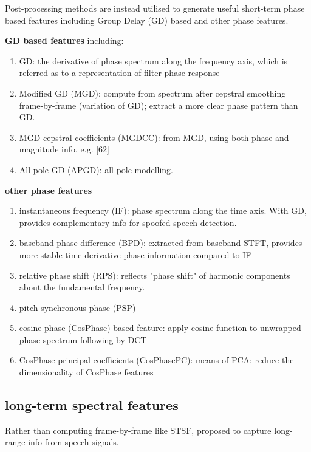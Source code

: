 \documentclass{article}
\begin{document}
Post-processing methods are instead utilised to generate useful short-term phase based features including Group Delay (GD) based and other phase features.

\vspace{5pt}
\textbf{GD based features}
including:

\begin{enumerate}
    \item GD: the derivative of phase spectrum along the frequency axis, which is referred as to a representation of filter phase response
    \item Modified GD (MGD): compute from spectrum after cepstral smoothing frame-by-frame (variation of GD); extract a more clear phase pattern than GD. 
    \item MGD cepstral coefficients (MGDCC): from MGD, using both phase and magnitude info. e.g. [62]
    \item All-pole GD (APGD): all-pole modelling. 
\end{enumerate}

\vspace{5pt}
\textbf{other phase features}
\begin{enumerate}
    \item instantaneous frequency (IF): phase spectrum along the time axis. With GD, provides complementary info for spoofed speech detection. 
    \item baseband phase difference (BPD): extracted from baseband STFT, provides more stable time-derivative phase information compared to IF
    \item relative phase shift (RPS): reflects "phase shift" of harmonic components about the fundamental frequency. 
    \item pitch synchronous phase (PSP)
    \item cosine-phase (CosPhase) based feature: apply cosine function to unwrapped phase spectrum following by DCT
    \item CosPhase principal coefficients (CosPhasePC): means of PCA; reduce the dimensionality of CosPhase features
\end{enumerate}

\subsection{long-term spectral features}
Rather than computing frame-by-frame like STSF, proposed to capture long-range info from speech signals. 
\end{document}
